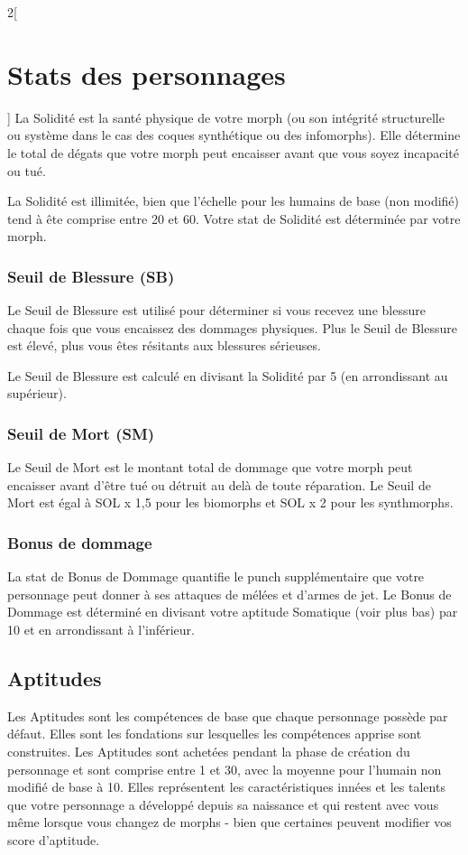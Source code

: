 \documentclass[a4paper,9pt]{article}
\begin{document}
\begin{multicols}{2}[\section{Stats des personnages} \label{sec:character-stats}]
La Solidité est la santé physique de votre morph (ou son intégrité structurelle
ou système dans le cas des coques synthétique ou des infomorphs). Elle
détermine le total de dégats que votre morph peut encaisser avant que vous
soyez incapacité ou tué.

La Solidité est illimitée, bien que l'échelle pour les humains de base (non
modifié) tend à ête comprise entre 20 et 60. Votre stat de Solidité est
déterminée par votre morph. 

\subsubsection{Seuil de Blessure (SB)} \label{sec:wound-threshold-wt} 

Le Seuil de Blessure est utilisé pour déterminer si vous recevez une blessure
chaque fois que vous encaissez des dommages physiques. Plus le Seuil de
Blessure est élevé, plus vous êtes résitants aux blessures sérieuses. 

Le Seuil de Blessure est calculé en divisant la Solidité par 5 (en arrondissant
au supérieur). 

\subsubsection{Seuil de Mort (SM)} \label{sec:death-rating-dr} 

Le Seuil de Mort est le montant total de dommage que votre morph peut encaisser
avant d'être tué ou détruit au delà de toute réparation. Le Seuil de Mort est
égal à SOL x 1,5 pour les biomorphs et SOL x 2 pour les synthmorphs. 

\subsubsection{Bonus de dommage} \label{sec:damage-bonus} 

La stat de Bonus de Dommage quantifie le punch supplémentaire que votre
personnage peut donner à ses attaques de mélées et d'armes de jet. Le Bonus de
Dommage est déterminé en divisant votre aptitude Somatique (voir plus bas) par
10 et en arrondissant à l'inférieur. 

\subsection{Aptitudes} \label{sec:aptitudes} 

Les Aptitudes sont les compétences de base que chaque personnage possède par
défaut. Elles sont les fondations sur lesquelles les compétences apprise sont
construites. Les Aptitudes sont achetées pendant la phase de création du
personnage et sont comprise entre 1 et 30, avec la moyenne pour l'humain non
modifié de base à 10. Elles représentent les caractéristiques innées et les
talents que votre personnage a développé depuis sa naissance et qui restent
avec vous même lorsque vous changez de morphs - bien que certaines peuvent
modifier vos score d'aptitude. 


\end{multicols}
\end{document}
